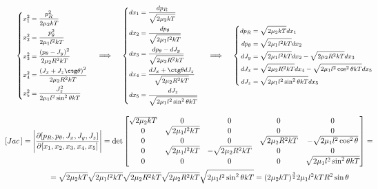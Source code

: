 \documentclass[12pt]{article}
\newcommand{\lb}{\left(}
\newcommand{\rb}{\right)}
\begin{document}
\vspace*{-0.3cm}
\begin{gather}
	\hspace*{-0.5cm}
	\everymath{\scriptstyle}
	\footnotesize
	\left\{
	\begin{aligned}
	x_1^2 &= \frac{p_R^2}{2 \mu_2 kT} \\
	x_2^2 &= \frac{p_\theta^2}{2 \mu_1 l^2 kT} \\
	x_3^2 &= \frac{ \lb p_\theta - J_y \rb^2}{2 \mu_2 R^2 k T} \\
	x_4^2 &= \frac{ \lb J_x + J_z \ctg \theta \rb^2}{2 \mu_2 R^2 k T} \\
	x_5^2 &= \frac{J_z^2}{2 \mu_1 l^2 \sin^2 \theta kT}
	\end{aligned}
	\right. \quad \implies \quad 
	\left\{
	\begin{aligned}
	dx_1 &= \frac{dp_R}{\sqrt{ 2 \mu_2 k T}} \\
	dx_2 &= \frac{dp_\theta}{\sqrt{2 \mu_1 l^2 k T}} \\
	dx_3 &= \frac{dp_\theta - dJ_y}{\sqrt{2 \mu_2 R^2 k T}} \\
	dx_4 &= \frac{dJ_x + \ctg \theta dJ_z}{ \sqrt{2 \mu_2 R^2 k T}} \\
	dx_5 &= \frac{dJ_z}{\sqrt{2 \mu_1 l^2 \sin^2 \theta k T}}
	\end{aligned}
	\right. \quad \implies \quad
	\left\{
	\begin{aligned}
		dp_R &= \sqrt{2 \mu_2 k T} dx_1 \\
		dp_\theta &= \sqrt{2 \mu_1 l^2 kT} dx_2 \\
		dJ_y &= \sqrt{2 \mu_1 l^2 kT} dx_2 - \sqrt{2 \mu_2 R^2 kT} dx_3 \\
		dJ_x &= \sqrt{2 \mu_2 R^2 kT} dx_4 - \sqrt{2 \mu_1 l^2 \cos^2 \theta kT} dx_5 \\
		dJ_z &= \sqrt{2 \mu_1 l^2 \sin^2 \theta kT} dx_5
	\end{aligned}
	\right.
	\notag
\end{gather}

\begin{gather}
	\hspace*{-1.0cm}
	\left[ Jac \, \right] = \Bigg{|} \frac{\partial [p_R, p_\theta, J_x, J_y, J_z]}{\partial [x_1, x_2, x_3, x_4, x_5]} \Bigg{|} = \det  
	\begin{bmatrix}
		\sqrt{2 \mu_2 k T} & 0 & 0 & 0 & 0 \\
		0 & \sqrt{2 \mu_1 l^2 k T} & 0 & 0 & 0 \\
		0 & 0 & 0 & \sqrt{2 \mu_2 R^2 k T} & -\sqrt{2 \mu_1 l^2 \cos^2 \theta} \\
		0 & \sqrt{2 \mu_1 l^2 k T} & -\sqrt{2 \mu_2 R^2 k T} & 0 & 0 \\
		0 & 0 & 0 & 0 & \sqrt{2 \mu_1 l^2 \sin^2 \theta k T}
	\end{bmatrix} = \notag \\
	= \sqrt{2 \mu_2 k T} \sqrt{2 \mu_1 l^2 k T} \sqrt{2 \mu_2 R^2 kT} \sqrt{2 \mu_2 R^2 kT} \sqrt{2 \mu_1 l^2 \sin^2 \theta kT} = (2 \mu_2 kT)^\frac{3}{2} 2\mu_1 l^2 k T R^2 \sin \theta \notag
\end{gather}
\end{document}
